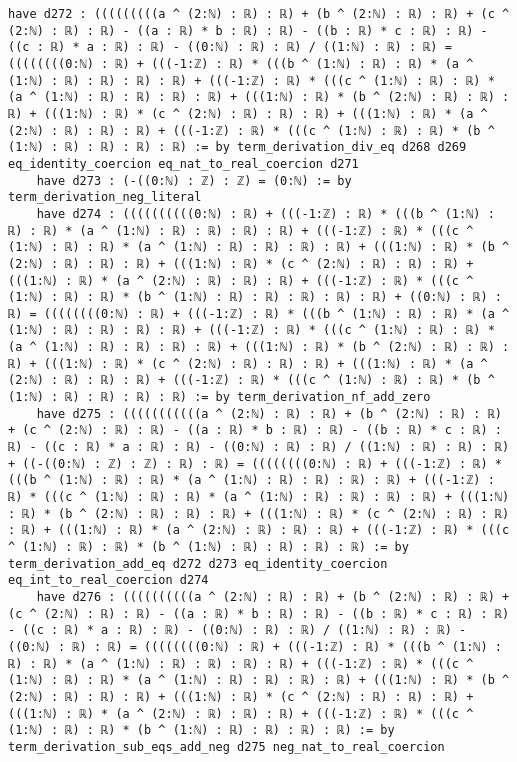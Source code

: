 \documentclass{article}
\begin{document}
\begin{tcolorbox}[colback=white!10, width=\linewidth]
\begin{lstlisting}[language=Lean4]
    have d272 : (((((((((a ^ (2:ℕ) : ℝ) : ℝ) + (b ^ (2:ℕ) : ℝ) : ℝ) + (c ^ (2:ℕ) : ℝ) : ℝ) - ((a : ℝ) * b : ℝ) : ℝ) - ((b : ℝ) * c : ℝ) : ℝ) - ((c : ℝ) * a : ℝ) : ℝ) - ((0:ℕ) : ℝ) : ℝ) / ((1:ℕ) : ℝ) : ℝ) = ((((((((0:ℕ) : ℝ) + (((-1:ℤ) : ℝ) * (((b ^ (1:ℕ) : ℝ) : ℝ) * (a ^ (1:ℕ) : ℝ) : ℝ) : ℝ) : ℝ) + (((-1:ℤ) : ℝ) * (((c ^ (1:ℕ) : ℝ) : ℝ) * (a ^ (1:ℕ) : ℝ) : ℝ) : ℝ) : ℝ) + (((1:ℕ) : ℝ) * (b ^ (2:ℕ) : ℝ) : ℝ) : ℝ) + (((1:ℕ) : ℝ) * (c ^ (2:ℕ) : ℝ) : ℝ) : ℝ) + (((1:ℕ) : ℝ) * (a ^ (2:ℕ) : ℝ) : ℝ) : ℝ) + (((-1:ℤ) : ℝ) * (((c ^ (1:ℕ) : ℝ) : ℝ) * (b ^ (1:ℕ) : ℝ) : ℝ) : ℝ) : ℝ) := by term_derivation_div_eq d268 d269 eq_identity_coercion eq_nat_to_real_coercion d271
    have d273 : (-((0:ℕ) : ℤ) : ℤ) = (0:ℕ) := by term_derivation_neg_literal
    have d274 : ((((((((((0:ℕ) : ℝ) + (((-1:ℤ) : ℝ) * (((b ^ (1:ℕ) : ℝ) : ℝ) * (a ^ (1:ℕ) : ℝ) : ℝ) : ℝ) : ℝ) + (((-1:ℤ) : ℝ) * (((c ^ (1:ℕ) : ℝ) : ℝ) * (a ^ (1:ℕ) : ℝ) : ℝ) : ℝ) : ℝ) + (((1:ℕ) : ℝ) * (b ^ (2:ℕ) : ℝ) : ℝ) : ℝ) + (((1:ℕ) : ℝ) * (c ^ (2:ℕ) : ℝ) : ℝ) : ℝ) + (((1:ℕ) : ℝ) * (a ^ (2:ℕ) : ℝ) : ℝ) : ℝ) + (((-1:ℤ) : ℝ) * (((c ^ (1:ℕ) : ℝ) : ℝ) * (b ^ (1:ℕ) : ℝ) : ℝ) : ℝ) : ℝ) : ℝ) + ((0:ℕ) : ℝ) : ℝ) = ((((((((0:ℕ) : ℝ) + (((-1:ℤ) : ℝ) * (((b ^ (1:ℕ) : ℝ) : ℝ) * (a ^ (1:ℕ) : ℝ) : ℝ) : ℝ) : ℝ) + (((-1:ℤ) : ℝ) * (((c ^ (1:ℕ) : ℝ) : ℝ) * (a ^ (1:ℕ) : ℝ) : ℝ) : ℝ) : ℝ) + (((1:ℕ) : ℝ) * (b ^ (2:ℕ) : ℝ) : ℝ) : ℝ) + (((1:ℕ) : ℝ) * (c ^ (2:ℕ) : ℝ) : ℝ) : ℝ) + (((1:ℕ) : ℝ) * (a ^ (2:ℕ) : ℝ) : ℝ) : ℝ) + (((-1:ℤ) : ℝ) * (((c ^ (1:ℕ) : ℝ) : ℝ) * (b ^ (1:ℕ) : ℝ) : ℝ) : ℝ) : ℝ) := by term_derivation_nf_add_zero
    have d275 : (((((((((((a ^ (2:ℕ) : ℝ) : ℝ) + (b ^ (2:ℕ) : ℝ) : ℝ) + (c ^ (2:ℕ) : ℝ) : ℝ) - ((a : ℝ) * b : ℝ) : ℝ) - ((b : ℝ) * c : ℝ) : ℝ) - ((c : ℝ) * a : ℝ) : ℝ) - ((0:ℕ) : ℝ) : ℝ) / ((1:ℕ) : ℝ) : ℝ) : ℝ) + ((-((0:ℕ) : ℤ) : ℤ) : ℝ) : ℝ) = ((((((((0:ℕ) : ℝ) + (((-1:ℤ) : ℝ) * (((b ^ (1:ℕ) : ℝ) : ℝ) * (a ^ (1:ℕ) : ℝ) : ℝ) : ℝ) : ℝ) + (((-1:ℤ) : ℝ) * (((c ^ (1:ℕ) : ℝ) : ℝ) * (a ^ (1:ℕ) : ℝ) : ℝ) : ℝ) : ℝ) + (((1:ℕ) : ℝ) * (b ^ (2:ℕ) : ℝ) : ℝ) : ℝ) + (((1:ℕ) : ℝ) * (c ^ (2:ℕ) : ℝ) : ℝ) : ℝ) + (((1:ℕ) : ℝ) * (a ^ (2:ℕ) : ℝ) : ℝ) : ℝ) + (((-1:ℤ) : ℝ) * (((c ^ (1:ℕ) : ℝ) : ℝ) * (b ^ (1:ℕ) : ℝ) : ℝ) : ℝ) : ℝ) := by term_derivation_add_eq d272 d273 eq_identity_coercion eq_int_to_real_coercion d274
    have d276 : ((((((((((a ^ (2:ℕ) : ℝ) : ℝ) + (b ^ (2:ℕ) : ℝ) : ℝ) + (c ^ (2:ℕ) : ℝ) : ℝ) - ((a : ℝ) * b : ℝ) : ℝ) - ((b : ℝ) * c : ℝ) : ℝ) - ((c : ℝ) * a : ℝ) : ℝ) - ((0:ℕ) : ℝ) : ℝ) / ((1:ℕ) : ℝ) : ℝ) - ((0:ℕ) : ℝ) : ℝ) = ((((((((0:ℕ) : ℝ) + (((-1:ℤ) : ℝ) * (((b ^ (1:ℕ) : ℝ) : ℝ) * (a ^ (1:ℕ) : ℝ) : ℝ) : ℝ) : ℝ) + (((-1:ℤ) : ℝ) * (((c ^ (1:ℕ) : ℝ) : ℝ) * (a ^ (1:ℕ) : ℝ) : ℝ) : ℝ) : ℝ) + (((1:ℕ) : ℝ) * (b ^ (2:ℕ) : ℝ) : ℝ) : ℝ) + (((1:ℕ) : ℝ) * (c ^ (2:ℕ) : ℝ) : ℝ) : ℝ) + (((1:ℕ) : ℝ) * (a ^ (2:ℕ) : ℝ) : ℝ) : ℝ) + (((-1:ℤ) : ℝ) * (((c ^ (1:ℕ) : ℝ) : ℝ) * (b ^ (1:ℕ) : ℝ) : ℝ) : ℝ) : ℝ) := by term_derivation_sub_eqs_add_neg d275 neg_nat_to_real_coercion

\end{lstlisting}
\end{tcolorbox}
\end{document}

